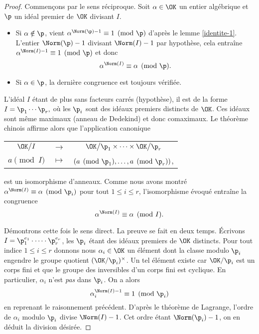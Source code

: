 \begin{proof}
	Commençons par le sens réciproque. Soit $\alpha\in \OK$ un entier algébrique et $\p$ un idéal premier de $\OK$ divisant $I$.
	\begin{itemize}
		\item Si $\alpha \notin \p$, vient $\alpha^{\Norm(\p) - 1} \equiv 1 \pmod{\p}$ d'après le lemme \ref{identite-1}. L'entier $\Norm(\p) - 1$ divisant $\Norm(I) - 1$ par hypothèse, cela entraîne $\alpha^{\Norm(I)-1}\equiv 1 \pmod{\p}$ et donc \[\alpha^{\Norm(I)} \equiv \alpha \pmod{\p}.\]
		\item Si $\alpha\in \p$, la dernière congruence est toujours vérifiée.
	\end{itemize}
	L'idéal $I$ étant de plus sans facteurs carrés (hypothèse), il est de la forme $I = \p_1 \cdots \p_r,$ où les $\p_i$ sont des idéaux premiers distincts de $\OK$. Ces idéaux sont même maximaux (anneau de Dedekind) et donc comaximaux. Le théorème chinois affirme alors que l'application canonique
\begin{center}
	\begin{tabular}{ccc}
		$\OK \big/I$ & $\longrightarrow$ & $\OK\big/\p_1\times \dots \times \OK\big/ \p_r$ \\
		$a\pmod{I} $	& $\longmapsto$ & $\left(a\pmod{\p_1} , \dots, a\pmod{\p_r}\right)$,
	\end{tabular}
\end{center}
est un isomorphisme d'anneaux. Comme nous avons montré $\alpha^{\Norm(I)} \equiv \alpha \pmod{\p_i}$ pour tout $1\leq i \leq r$, l'isomorphisme évoqué entraîne la congruence \[\alpha^{\Norm(I)} \equiv \alpha \pmod{I}.\]

	Démontrons cette fois le sens direct. La preuve se fait en deux temps. Écrivons $I = \p_1^{e_1} \cdot \dots \cdot \p_r^{e_r}$, les $\p_i$ étant des idéaux premiers de $\OK$ distincts. Pour tout indice $1\leqslant i \leqslant r$ donnons nous $\alpha_i\in \OK$ un élément dont la classe modulo $\p_i$ engendre le groupe quotient $(\OK/\p_i)^\times$. Un tel élément existe car $\OK/\p_i$ est un corps fini et que le groupe des inversibles d'un corps fini est cyclique. En particulier, $\alpha_i$ n'est \emph{pas} dans $\p_i$. On a alors \[\alpha_i^{\Norm(I) - 1} \equiv 1 \pmod{\p_i}\] en reprenant le raisonnement précédent. D'après le théorème de Lagrange, l'ordre de $\alpha_i$ modulo $\p_i$ divise $\Norm(I) - 1$. Cet ordre étant $\Norm(\p_i) - 1$, on en déduit la division désirée. 


\end{proof}
